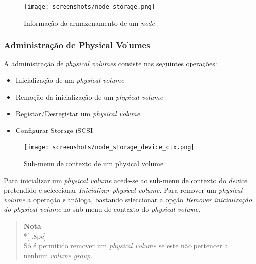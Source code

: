 \begin{figure}[H]
	\begin{center}
	\texttt{[image: screenshots/node\_storage.png]}
	\caption{Informação do armazenamento de um \emph{node}}
	\label{fig:inicial}
	\end{center}
\end{figure}


\subsubsection{Administração de Physical Volumes}
A administração de \emph{physical volumes} consiste nas seguintes operações:
\begin{itemize}
	\item Inicialização de um \emph{physical volume}
    \item Remoção da inicialização de um \emph{physical volume}
    \item Registar/Desregistar um \emph{physical volume}
    \item Configurar Storage iSCSI
\end{itemize}

\begin{figure}[H]
        \begin{center}
        \texttt{[image: screenshots/node\_storage\_device\_ctx.png]}
        \caption{Sub-menu de contexto de um physical volume}
        \label{fig:storage_device_ctx}
        \end{center}
\end{figure}


Para inicializar um \emph{physical volume} acede-se ao sub-menu de contexto do \emph{device} pretendido e seleccionar \emph{Inicializar physical volume}. Para remover um \emph{physical volume} a operação é análoga, bastando seleccionar a opção \emph{Remover inicialização do physical volume} no sub-menu de contexto do \emph{physical volume}.

\begin{quote}
	{\large \bf Nota} \\*[-.8pc]
	\underline{\hspace{6in}} \\
	Só é permitido remover um \emph{physical volume} se este não pertencer a nenhum \emph{volume group}.
\end{quote}

